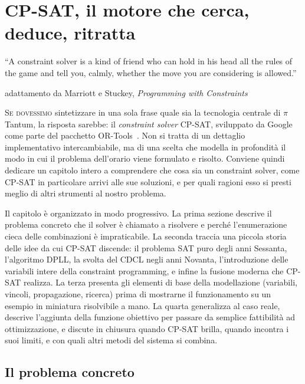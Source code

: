 \chapter{CP-SAT, il motore che cerca, deduce, ritratta}
\label{ch:metodo_cpsat}


\epigraph{``A constraint solver is a kind of friend who can hold
in his head all the rules of the game and tell you, calmly,
whether the move you are considering is allowed.''}{adattamento
da Marriott e Stuckey, \emph{Programming with
Constraints}~\parencite{marriott1998}}

\lettrine[lines=3]{S}{e dovessimo} sintetizzare in una sola
frase quale sia la tecnologia centrale di $\pi$Tantum, la
risposta sarebbe: il \emph{constraint solver} CP-SAT,
sviluppato da Google come parte del pacchetto
OR-Tools~\parencite{ortools}. Non si tratta di un dettaglio
implementativo intercambiabile, ma di una scelta che modella
in profondit\`a il modo in cui il problema dell'orario viene
formulato e risolto. Conviene quindi dedicare un capitolo
intero a comprendere che cosa sia un constraint solver, come
CP-SAT in particolare arrivi alle sue soluzioni, e per
quali ragioni esso si presti meglio di altri strumenti al
nostro problema.

Il capitolo \`e organizzato in modo progressivo. La prima
sezione descrive il problema concreto che il solver \`e
chiamato a risolvere e perch\'e l'enumerazione cieca delle
combinazioni \`e impraticabile. La seconda traccia una
piccola storia delle idee da cui CP-SAT discende: il
problema SAT puro degli anni Sessanta, l'algoritmo DPLL, la
svolta del CDCL negli anni Novanta, l'introduzione delle
variabili intere della constraint programming, e infine la
fusione moderna che CP-SAT realizza. La terza presenta gli
elementi di base della modellazione (variabili, vincoli,
propagazione, ricerca) prima di mostrarne il funzionamento
su un esempio in miniatura risolvibile a mano. La quarta
generalizza al caso reale, descrive l'aggiunta della
funzione obiettivo per passare da semplice fattibilit\`a ad
ottimizzazione, e discute in chiusura quando CP-SAT brilla,
quando incontra i suoi limiti, e con quali altri metodi del
sistema si combina.

\section{Il problema concreto}

